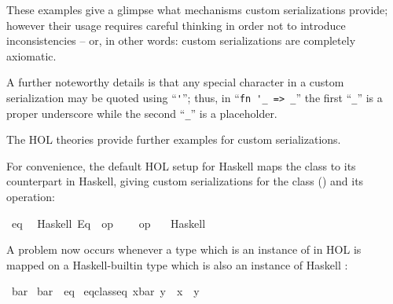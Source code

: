 \begin{isabellebody}
\begin{isamarkuptext}
  These examples give a glimpse what mechanisms
  custom serializations provide; however their usage
  requires careful thinking in order not to introduce
  inconsistencies -- or, in other words:
  custom serializations are completely axiomatic.

  A further noteworthy details is that any special
  character in a custom serialization may be quoted
  using ``\verb|'|''; thus, in
  ``\verb|fn '_ => _|'' the first
  ``\verb|_|'' is a proper underscore while the
  second ``\verb|_|'' is a placeholder.

  The HOL theories provide further
  examples for custom serializations.%
\end{isamarkuptext}%
\isamarkuptrue%
%
\isamarkuptrue%
%
\begin{isamarkuptext}%
For convenience, the default
  HOL setup for Haskell maps the  class to
  its counterpart in Haskell, giving custom serializations
  for the class (\isa{{\isasymCODECLASS}}) and its operation:%
\end{isamarkuptext}%
\isamarkuptrue%
%
\isadelimtt
%
\endisadelimtt
%
\isatagtt
{}\isamarkupfalse%
\ eq\isanewline
\ \ {\isacharparenleft}Haskell\ {\isachardoublequoteopen}Eq{\isachardoublequoteclose}\ \ {\isachardoublequoteopen}op\ {\isacharequal}{\isachardoublequoteclose}\ {\isasymequiv}\ {\isachardoublequoteopen}{\isacharparenleft}{\isacharequal}{\isacharequal}{\isacharparenright}{\isachardoublequoteclose}{\isacharparenright}\isanewline
\isanewline
{}\isamarkupfalse%
\ {\isachardoublequoteopen}op\ {\isacharequal}{\isachardoublequoteclose}\isanewline
\ \ {\isacharparenleft}Haskell\ \ {}\ {\isachardoublequoteopen}{\isacharequal}{\isacharequal}{\isachardoublequoteclose}{\isacharparenright}%
\endisatagtt
{\isafoldtt}%
%
\isadelimtt
%
\endisadelimtt
%
\begin{isamarkuptext}%
A problem now occurs whenever a type which
  is an instance of  in HOL is mapped
  on a Haskell-builtin type which is also an instance
  of Haskell :%
\end{isamarkuptext}%
\isamarkuptrue%
\isamarkupfalse%
\ bar\isanewline
\isanewline
{}\isamarkupfalse%
\ bar\ {\isacharcolon}{\isacharcolon}\ eq\isanewline
{}\isanewline
\isanewline
{}\isamarkupfalse%
\ {\isachardoublequoteopen}eq{\isacharunderscore}class{\isachardot}eq\ {\isacharparenleft}x{\isasymColon}bar{\isacharparenright}\ y\ {\isasymlongleftrightarrow}\ x\ {\isacharequal}\ y{\isachardoublequoteclose}\isanewline

\end{isabellebody}
